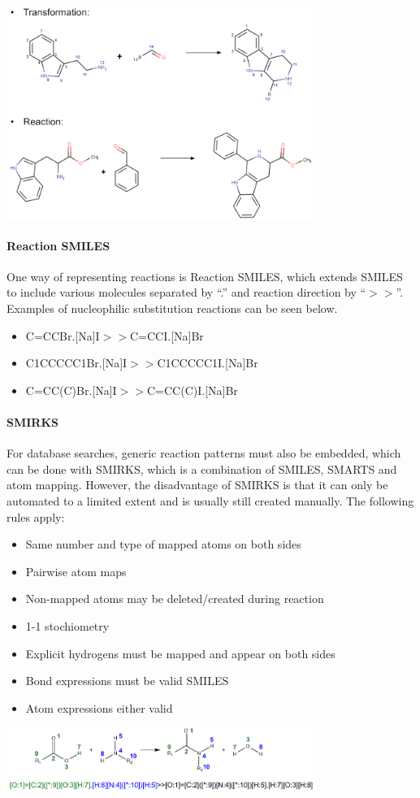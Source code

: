\begin{center}\includegraphics[width=0.75\textwidth]{img/cheminformatics/ChemicalReactionsTransformation.png}\end{center}

\paragraph{Reaction SMILES}
One way of representing reactions is Reaction SMILES, which extends SMILES to include various molecules separated by “.” and reaction direction by “$>>$”. Examples of nucleophilic substitution reactions can be seen below. 

\begin{itemize}
    \item C=CCBr.[Na]I$>>$C=CCI.[Na]Br
    \item C1CCCCC1Br.[Na]I$>>$C1CCCCC1I.[Na]Br
    \item C=CC(C)Br.[Na]I$>>$C=CC(C)I.[Na]Br
\end{itemize}

\paragraph{SMIRKS}
For database searches, generic reaction patterns must also be embedded, which can be done with SMIRKS, which is a combination of SMILES, SMARTS and atom mapping. However, the disadvantage of SMIRKS is that it can only be automated to a limited extent and is usually still created manually. The following rules apply:

\begin{itemize}
    \item Same number and type of mapped atoms on both sides
    \item Pairwise atom maps
    \item Non-mapped atoms may be deleted/created during reaction
    \item 1-1 stochiometry
    \item Explicit hydrogens must be mapped and appear on both sides
    \item Bond expressions must be valid SMILES
    \item Atom expressions either valid
\end{itemize}

\begin{center}\includegraphics[width=0.75\textwidth]{img/cheminformatics/ChemicalReactionsSmirks.png}\end{center}

